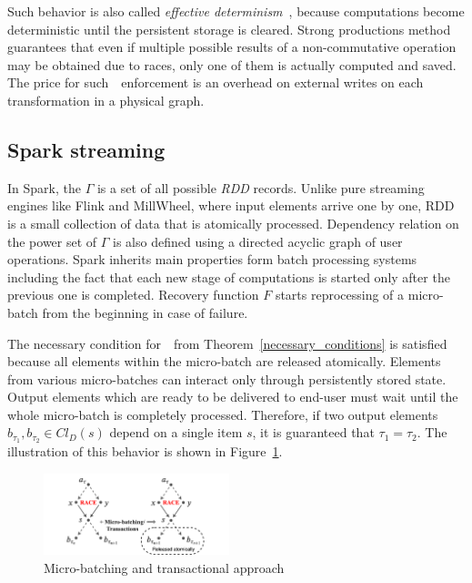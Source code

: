 Such behavior is also called {\em effective determinism}~\cite{akidau2018streaming}, because computations become deterministic until the persistent storage is cleared. Strong productions method guarantees that even if multiple possible results of a non-commutative operation may be obtained due to races, only one of them is actually computed and saved. The price for such~\eo\ enforcement is an overhead on external writes on each transformation in a physical graph.


\subsection{Spark streaming}

In Spark, the  $\Gamma$ is a set of all possible {\em RDD} records. Unlike pure streaming engines like Flink and MillWheel, where input elements arrive one by one, RDD is a small collection of data that is atomically processed. Dependency relation on the power set of $\Gamma$ is also defined using a directed acyclic graph of user operations. Spark inherits main properties form batch processing systems including the fact that each new stage of computations is started only after the previous one is completed. Recovery function $F$ starts reprocessing of a micro-batch from the beginning in case of failure.

The necessary condition for~\eo\ from Theorem~\ref{necessary_conditions} is satisfied because all elements within the micro-batch are released atomically. Elements from various micro-batches can interact only through persistently stored state. Output elements which are ready to be delivered to end-user must wait until the whole micro-batch is completely processed. Therefore, if two output elements $b_{\tau_1},b_{\tau_2} \in Cl_D(s)$ depend on a single item $s$, it is guaranteed that $\tau_1=\tau_2$. The illustration of this behavior is shown in Figure~\ref{spark_flink}. 

 
\begin{figure}[htbp]
  \centering
  \includegraphics[width=0.48\textwidth]{pics/spark-flink}
  \caption{Micro-batching and transactional approach}
  \label{spark_flink}
\end{figure}
 
